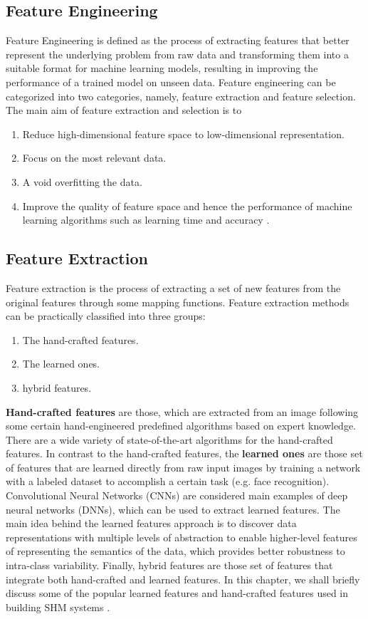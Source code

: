 \subsection{Feature Engineering}
Feature Engineering is defined as the process of extracting features that better 
represent the underlying problem from raw data and transforming them into a suitable 
format for machine learning models, resulting in improving the performance of a trained 
model on unseen data. Feature engineering can be categorized into two categories, namely, 
feature extraction and feature selection. The main aim of feature extraction and selection is to
\begin{enumerate}
    \item Reduce high-dimensional feature space to low-dimensional representation.
    \item Focus on the most relevant data.
    \item A void overfitting the data.
    \item Improve the quality of feature space and hence the performance of machine
        learning algorithms such as learning time and accuracy \cite{esr20}.
\end{enumerate}

\subsection{Feature Extraction}
Feature extraction is the process of extracting a set of new features from the original 
features through some mapping functions. Feature extraction methods can be practically 
classified into three groups: \cite{esr20}
\begin{enumerate}
    \item The hand-crafted features.
    \item The learned ones.
    \item hybrid features.
\end{enumerate}

\textbf{Hand-crafted features} are those, which are extracted from an image following some 
certain hand-engineered predefined algorithms based on expert knowledge. There are 
a wide variety of state-of-the-art algorithms for the hand-crafted features.
In contrast to the hand-crafted features, the \textbf{learned ones} are those set 
of features that are learned directly from raw input images by training a network 
with a labeled dataset to accomplish a certain task (e.g. face recognition). 
Convolutional Neural Networks (CNNs) are considered main examples of deep 
neural networks (DNNs), which can be used to extract learned features. The 
main idea behind the learned features approach is to discover data 
representations with multiple levels of abstraction to enable higher-level
features of representing the semantics of the data, which provides better 
robustness to intra-class variability. Finally, hybrid features are those 
set of features that integrate both hand-crafted and learned features. 
In this chapter, we shall briefly discuss some of the popular learned 
features and hand-crafted features used in building SHM systems \cite{esr20}.


